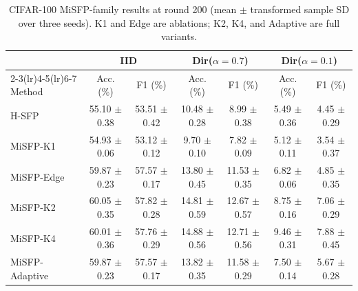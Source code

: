 \begin{table}[t]
\caption{CIFAR-100 MiSFP-family results at round 200 (mean $\pm$ transformed sample SD over three seeds). K1 and Edge are ablations; K2, K4, and Adaptive are full variants.}
\label{tab:main}
\centering\footnotesize
\setlength{\tabcolsep}{3pt}
\begin{tabular*}{\textwidth}{@{\extracolsep{\fill}}lcccccc@{}}\toprule
& \multicolumn{2}{c}{IID} & \multicolumn{2}{c}{Dir($\alpha{=}0.7$)} & \multicolumn{2}{c}{Dir($\alpha{=}0.1$)}\\
\cmidrule(lr){2-3}\cmidrule(lr){4-5}\cmidrule(lr){6-7}
Method & Acc. (\%) & F1 (\%) & Acc. (\%) & F1 (\%) & Acc. (\%) & F1 (\%)\\\midrule
H-SFP & 55.10 {\scriptsize $\pm$ 0.38} & 53.51 {\scriptsize $\pm$ 0.42} & 10.48 {\scriptsize $\pm$ 0.28} & 8.99 {\scriptsize $\pm$ 0.38} & 5.49 {\scriptsize $\pm$ 0.36} & 4.45 {\scriptsize $\pm$ 0.29} \\
MiSFP-K1 & 54.93 {\scriptsize $\pm$ 0.06} & 53.12 {\scriptsize $\pm$ 0.12} & 9.70 {\scriptsize $\pm$ 0.10} & 7.82 {\scriptsize $\pm$ 0.09} & 5.12 {\scriptsize $\pm$ 0.11} & 3.54 {\scriptsize $\pm$ 0.37} \\
MiSFP-Edge & 59.87 {\scriptsize $\pm$ 0.23} & 57.57 {\scriptsize $\pm$ 0.17} & 13.80 {\scriptsize $\pm$ 0.45} & 11.53 {\scriptsize $\pm$ 0.35} & 6.82 {\scriptsize $\pm$ 0.06} & 4.85 {\scriptsize $\pm$ 0.35} \\
MiSFP-K2 & 60.05 {\scriptsize $\pm$ 0.35} & 57.82 {\scriptsize $\pm$ 0.28} & 14.81 {\scriptsize $\pm$ 0.59} & 12.67 {\scriptsize $\pm$ 0.57} & 8.75 {\scriptsize $\pm$ 0.16} & 7.06 {\scriptsize $\pm$ 0.29} \\
MiSFP-K4 & 60.01 {\scriptsize $\pm$ 0.36} & 57.76 {\scriptsize $\pm$ 0.29} & 14.88 {\scriptsize $\pm$ 0.56} & 12.71 {\scriptsize $\pm$ 0.56} & 9.46 {\scriptsize $\pm$ 0.31} & 7.88 {\scriptsize $\pm$ 0.45} \\
MiSFP-Adaptive & 59.87 {\scriptsize $\pm$ 0.23} & 57.57 {\scriptsize $\pm$ 0.17} & 13.82 {\scriptsize $\pm$ 0.35} & 11.58 {\scriptsize $\pm$ 0.29} & 7.50 {\scriptsize $\pm$ 0.14} & 5.67 {\scriptsize $\pm$ 0.28} \\
\bottomrule
\end{tabular*}
\end{table}

